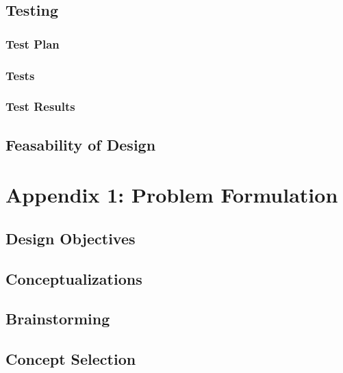 \documentclass{article}
\begin{document}
\subsection{Testing}
\subsubsection{Test Plan}


\pagebreak

\subsubsection{Tests}


\subsubsection{Test Results}


\subsection{Feasability of Design} %


\pagebreak


\appendix

\section{Appendix 1: Problem Formulation}
\subsection{Design Objectives}


\subsection{Conceptualizations}

\subsection{Brainstorming}

\subsection{Concept Selection}

\pagebreak
\end{document}

